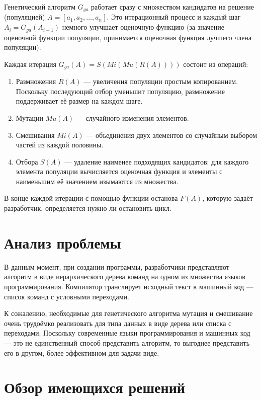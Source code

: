 \documentclass[utf8,a5paper,portrait,12pt]{eskdtext}
\begin{document}
Генетический алгоритм $G_{ga}$ работает сразу с множеством кандидатов на решение
(популяцией) $A = [a_1, a_2, …, a_n]$. Это итерационный процесс и каждый шаг
$A_i = G_{ga}(A_{i-1})$ немного улучшает оценочную функцию (за значение
оценочной функции популяции, принимается оценочная функция лучшего члена
популяции).

Каждая итерация $G_{ga}(A) = S(Mi(Mu(R(A))))$ состоит из
операций:\cite{reinforcement}
\begin{enumerate}
  \item Размножения $R(A)$ — увеличения популяции простым копированием.
        Поскольку последующий отбор уменьшит популяцию, размножение поддерживает
        её размер на каждом шаге.
  \item Мутации $Mu(A)$ — случайного изменения элементов.
  \item Смешивания $Mi(A)$ — объединения двух элементов со случайным выбором
        частей из каждой половины.
  \item Отбора $S(A)$ — удаление наименее подходящих кандидатов: для каждого
        элемента популяции вычисляется оценочная функция и элементы с
        наименьшим её значением изымаются из множества.
\end{enumerate}

В конце каждой итерации с помощью функции останова $F(A)$, которую задаёт
разработчик, определяется нужно ли остановить цикл.

\section{Анализ проблемы}

В данным момент, при создании программы, разработчики представляют алгоритм в
виде иерархического дерева команд на одном из множества языков программирования.
Компилятор транслирует исходный текст в машинный код — список команд с условными
переходами.

К сожалению, необходимые для генетического алгоритма мутация и смешивание очень
трудоёмко реализовать для типа данных в виде дерева или списка с переходами.
Поскольку современные языки программирования и машинных код — это не
единственный способ представить алгоритм, то выгоднее представить его в другом,
более эффективном для задачи виде.

\section{Обзор имеющихся решений}
\end{document}
